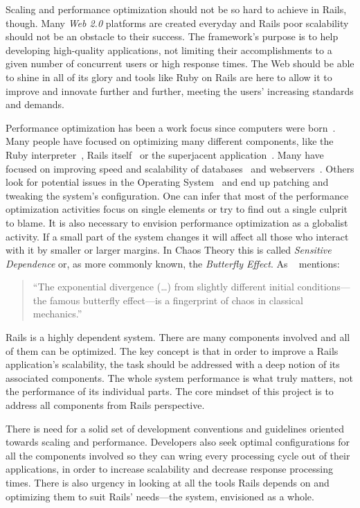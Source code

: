 Scaling and performance optimization should not be so hard to achieve in Rails, though. Many \textit{Web 2.0} platforms are created everyday and Rails poor scalability should not be an obstacle to their success. The framework's purpose is to help developing high-quality applications, not limiting their accomplishments to a given number of concurrent users or high response times. The Web should be able to shine in all of its glory and tools like Ruby on Rails are here to allow it to improve and innovate further and further, meeting the users' increasing standards and demands.

Performance optimization has been a work focus since computers were born~\cite{mass_memory_system_optimization}. Many people have focused on optimizing many different components, like the Ruby interpreter~\cite{yarv}, Rails itself~\cite{rails_merb_merge_performance} or the superjacent application~\cite{scaling_rails_bottomup,vaporware_to_awesome,rebuilding_scaling_yellowpages,5tips_scale_ror}. Many have focused on improving speed and scalability of databases~\cite{performance_analysis_db_arch} and webservers~\cite{webserver_scheduling}. Others look for potential issues in the Operating System~\cite{unix_os_comparison, architecture_impact_os} and end up patching and tweaking the system's configuration. One can infer that most of the performance optimization activities focus on single elements or try to find out a single culprit to blame. It is also necessary to envision performance optimization as a globalist activity. If a small part of the system changes it will affect all those who interact with it by smaller or larger margins. In Chaos Theory this is called \textit{Sensitive Dependence} or, as more commonly known, the \textit{Butterfly Effect}. As ~\cite{butterfly_effect_quote} mentions:
\begin{quote}
  ``The exponential divergence (\ldots) from slightly different initial conditions---the famous butterfly effect---is a fingerprint of chaos in classical mechanics.''
\end{quote}
Rails is a highly dependent system. There are many components involved and all of them can be optimized. The key concept is that in order to improve a Rails application's scalability, the task should be addressed with a deep notion of its associated components. The whole system performance is what truly matters, not the performance of its individual parts. The core mindset of this project is to address all components from Rails perspective.

There is need for a solid set of development conventions and guidelines oriented towards scaling and performance. Developers also seek optimal configurations for all the components involved so they can wring every processing cycle out of their applications, in order to increase scalability and decrease response processing times. There is also urgency in looking at all the tools Rails depends on and optimizing them to suit Rails' needs---the system, envisioned as a whole.

